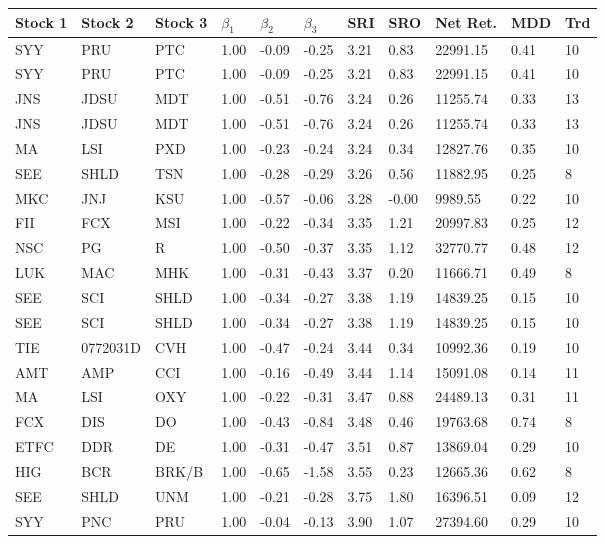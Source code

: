 \documentclass[11pt,a4,twosided,singlespacing,titlepagenumber=on]{scrreprt}
\numberwithin{equation}{chapter} %
\theoremstyle{remark}
\begin{document}
\begin{table}[H]
\centering
\begin{tabular}{lllllllllll}
\hline
Stock 1 & Stock 2 & Stock 3 & $\beta_1$ & $\beta_2$ & $\beta_3$ & SRI & SRO & Net Ret. & MDD & Trd\\ \hline
SYY  & PRU  & PTC  & 1.00 & -0.09 & -0.25 & 3.21 & 0.83 & 22991.15 & 0.41 & 10 \\
SYY  & PRU  & PTC  & 1.00 & -0.09 & -0.25 & 3.21 & 0.83 & 22991.15 & 0.41 & 10 \\
JNS  & JDSU  & MDT  & 1.00 & -0.51 & -0.76 & 3.24 & 0.26 & 11255.74 & 0.33 & 13 \\
JNS  & JDSU  & MDT  & 1.00 & -0.51 & -0.76 & 3.24 & 0.26 & 11255.74 & 0.33 & 13 \\
MA  & LSI  & PXD  & 1.00 & -0.23 & -0.24 & 3.24 & 0.34 & 12827.76 & 0.35 & 10 \\
SEE  & SHLD  & TSN  & 1.00 & -0.28 & -0.29 & 3.26 & 0.56 & 11882.95 & 0.25 & 8 \\
MKC  & JNJ  & KSU  & 1.00 & -0.57 & -0.06 & 3.28 & -0.00 & 9989.55 & 0.22 & 10 \\
FII  & FCX  & MSI  & 1.00 & -0.22 & -0.34 & 3.35 & 1.21 & 20997.83 & 0.25 & 12 \\
NSC  & PG  & R  & 1.00 & -0.50 & -0.37 & 3.35 & 1.12 & 32770.77 & 0.48 & 12 \\
LUK  & MAC  & MHK  & 1.00 & -0.31 & -0.43 & 3.37 & 0.20 & 11666.71 & 0.49 & 8 \\
SEE  & SCI  & SHLD  & 1.00 & -0.34 & -0.27 & 3.38 & 1.19 & 14839.25 & 0.15 & 10 \\
SEE  & SCI  & SHLD  & 1.00 & -0.34 & -0.27 & 3.38 & 1.19 & 14839.25 & 0.15 & 10 \\
TIE  & 0772031D  & CVH  & 1.00 & -0.47 & -0.24 & 3.44 & 0.34 & 10992.36 & 0.19 & 10 \\
AMT  & AMP  & CCI  & 1.00 & -0.16 & -0.49 & 3.44 & 1.14 & 15091.08 & 0.14 & 11 \\
MA  & LSI  & OXY  & 1.00 & -0.22 & -0.31 & 3.47 & 0.88 & 24489.13 & 0.31 & 11 \\
FCX  & DIS  & DO  & 1.00 & -0.43 & -0.84 & 3.48 & 0.46 & 19763.68 & 0.74 & 8 \\
ETFC  & DDR  & DE  & 1.00 & -0.31 & -0.47 & 3.51 & 0.87 & 13869.04 & 0.29 & 10 \\
HIG  & BCR  & BRK/B  & 1.00 & -0.65 & -1.58 & 3.55 & 0.23 & 12665.36 & 0.62 & 8 \\
SEE  & SHLD  & UNM  & 1.00 & -0.21 & -0.28 & 3.75 & 1.80 & 16396.51 & 0.09 & 12 \\
SYY  & PNC  & PRU  & 1.00 & -0.04 & -0.13 & 3.90 & 1.07 & 27394.60 & 0.29 & 10 \\
\hline
\end{tabular}
\end{table}
\end{document}
